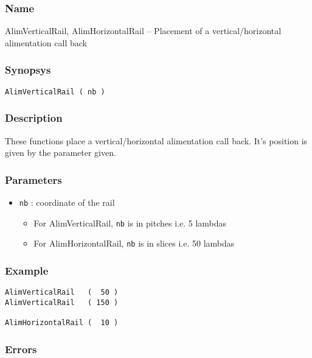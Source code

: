 \subsubsection{Name}

AlimVerticalRail, AlimHorizontalRail -- Placement of a vertical/horizontal alimentation call back

\subsubsection{Synopsys}

\begin{verbatim}
AlimVerticalRail ( nb )
\end{verbatim}

\subsubsection{Description}

These functions place a vertical/horizontal alimentation call back. It's position is given by the parameter given.
    
\subsubsection{Parameters}

\begin{itemize}
    \item \verb-nb- : coordinate of the rail
    \begin{itemize}
        \item For AlimVerticalRail, \verb-nb- is in pitches i.e. 5 lambdas
        \item For AlimHorizontalRail, \verb-nb- is in slices i.e. 50 lambdas
    \end{itemize}
\end{itemize}
    
\subsubsection{Example}

\begin{verbatim}
AlimVerticalRail   (  50 )
AlimVerticalRail   ( 150 )
    
AlimHorizontalRail (  10 )
\end{verbatim}

\subsubsection{Errors}
    
